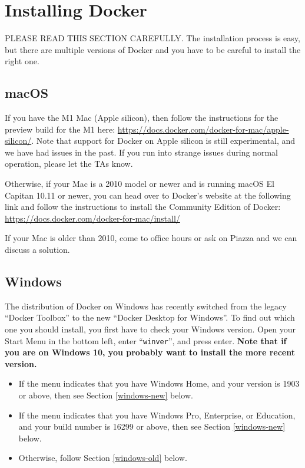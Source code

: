 \section{Installing Docker}

PLEASE READ THIS SECTION CAREFULLY. The installation process is easy, but there are multiple versions of Docker and you have to be careful to install the right one.

\subsection{macOS}

If you have the M1 Mac (Apple silicon), then follow the instructions for the preview build for the M1 here: \url{https://docs.docker.com/docker-for-mac/apple-silicon/}. Note that support for Docker on Apple silicon is still experimental, and we have had issues in the past. If you run into strange issues during normal operation, please let the TAs know.

Otherwise, if your Mac is a 2010 model or newer and is running macOS El Capitan 10.11 or newer, you can head over to Docker’s website at the following link and follow the instructions to install the Community Edition of Docker: \url{https://docs.docker.com/docker-for-mac/install/}

If your Mac is older than 2010, come to office hours or ask on Piazza and we can discuss a solution.

\subsection{Windows}

The distribution of Docker on Windows has recently switched from the legacy ``Docker Toolbox'' to the new ``Docker Desktop for Windows''. To find out which one you should install, you first have to check your Windows version. Open your Start Menu in the bottom left, enter ``\texttt{winver}'', and press enter. \textbf{Note that if you are on Windows 10, you probably want to install the more recent version.}

\begin{itemize}
    \item If the menu indicates that you have Windows Home, and your version is 1903 or above, then see Section \ref{windows-new} below.
    \item If the menu indicates that you have Windows Pro, Enterprise, or Education, and your build number is 16299 or above, then see Section \ref{windows-new} below.
    \item Otherwise, follow Section \ref{windows-old} below.
\end{itemize}

